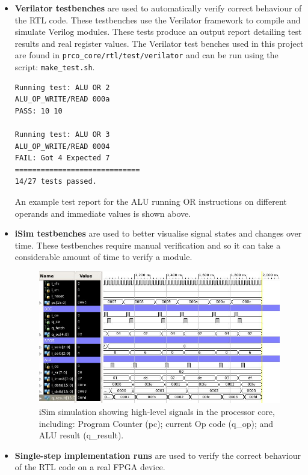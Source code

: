 \documentclass[11pt,a4paper]{report}
\begin{document}
\begin{itemize}
\item{\textbf{Verilator testbenches} are used to automatically verify correct behaviour of the RTL code. These testbenches use the Verilator framework to compile and simulate Verilog modules. These tests produce an output report detailing test results and real register values. 
The Verilator test benches used in this project are found in \verb|prco_core/rtl/test/verilator| and can be run using the script: \verb|make_test.sh|.

\begin{verbatim}
Running test: ALU OR 2
ALU_OP_WRITE/READ 000a
PASS: 10 10

Running test: ALU OR 3
ALU_OP_WRITE/READ 0004
FAIL: Got 4 Expected 7
=============================
14/27 tests passed.
\end{verbatim}
An example test report for the ALU running OR instructions on different operands and immediate values is shown above.
}

\item{\textbf{iSim testbenches} are used to better visualise signal states and changes over time. These testbenches require manual verification and so it can take a considerable amount of time to verify a module.

\begin{figure}[H]
\begin{center}
\includegraphics[scale=0.5]{core_test_isim}
\end{center}
\caption{iSim simulation showing high-level signals in the processor core, including: Program Counter (pc); current Op code (q\_op); and ALU result (q\_result).}
\label{fig:core_test_isim}
\end{figure}
}

\item{\textbf{Single-step implementation runs} are used to verify the correct behaviour of the RTL code on a real FPGA device. 

}
\end{itemize}
\end{document}
